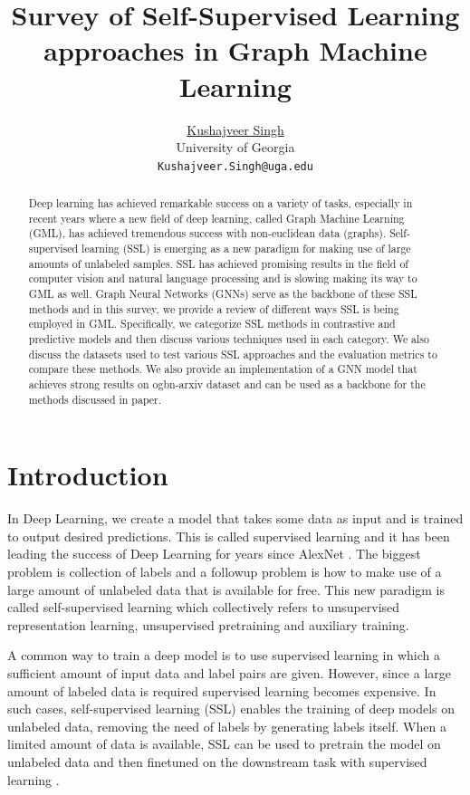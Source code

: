 \documentclass{article}
\title{Survey of Self-Supervised Learning approaches in Graph Machine Learning}
\author{ \href{https://kushajveersingh.github.io}{Kushajveer Singh} \\
	University of Georgia\\
	\texttt{Kushajveer.Singh@uga.edu}
}
\begin{document}
\maketitle

\begin{abstract}
	Deep learning has achieved remarkable success on a variety of tasks, especially in recent years where a new field of deep learning, called Graph Machine Learning (GML), has achieved tremendous success with non-euclidean data (graphs). Self-supervised learning (SSL) is emerging as a new paradigm for making use of large amounts of unlabeled samples. SSL has achieved promising results in the field of computer vision and natural language processing and is slowing making its way to GML as well. Graph Neural Networks (GNNs) serve as the backbone of these SSL methods and in this survey, we provide a review of different ways SSL is being employed in GML. Specifically, we categorize SSL methods in contrastive and predictive models and then discuss various techniques used in each category. We also discuss the datasets used to test various SSL approaches and the evaluation metrics to compare these methods. We also provide an implementation of a GNN model that achieves strong results on ogbn-arxiv dataset and can be used as a backbone for the methods discussed in paper.
\end{abstract}



\section{Introduction}
In Deep Learning, we create a model that takes some data as input and is trained to output desired predictions. This is called supervised learning and it has been leading the success of Deep Learning for years since AlexNet \citep{alexnet}. The biggest problem is collection of labels and a followup problem is how to make use of a large amount of unlabeled data that is available for free. This new paradigm is called self-supervised learning which collectively refers to unsupervised representation learning, unsupervised pretraining and auxiliary training.

A common way to train a deep model is to use supervised learning in which a sufficient amount of input data and label pairs are given. However, since a large amount of labeled data is required supervised learning becomes expensive. In such cases, self-supervised learning (SSL) enables the training of deep models on unlabeled data, removing the need of labels by generating labels itself. When a limited amount of data is available, SSL can be used to pretrain the model on unlabeled data and then finetuned on the downstream task with supervised learning \citep{finetune1, finetune2}.
\end{document}
